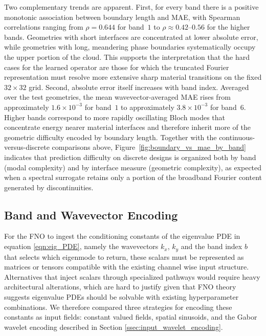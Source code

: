 \documentclass[preprint,review,12pt,numafflabel]{elsarticle}
\begin{document}
Two complementary trends are apparent. First, for every band there is a positive monotonic association between boundary length and MAE, with Spearman correlations ranging from $\rho=0.644$ for band~$1$ to $\rho\approx0.42$--$0.56$ for the higher bands. Geometries with short interfaces are concentrated at lower absolute error, while geometries with long, meandering phase boundaries systematically occupy the upper portion of the cloud. This supports the interpretation that the hard cases for the learned operator are those for which the truncated Fourier representation must resolve more extensive sharp material transitions on the fixed $32\times32$ grid.
Second, absolute error itself increases with band index. Averaged over the test geometries, the mean wavevector-averaged MAE rises from approximately $1.6\times10^{-3}$ for band~$1$ to approximately $3.8\times10^{-3}$ for band~$6$. Higher bands correspond to more rapidly oscillating Bloch modes that concentrate energy nearer material interfaces and therefore inherit more of the geometric difficulty encoded by boundary length. Together with the continuous-versus-discrete comparisons above, Figure~\ref{fig:boundary_vs_mae_by_band} indicates that prediction difficulty on discrete designs is organized both by band (modal complexity) and by interface measure (geometric complexity), as expected when a spectral surrogate retains only a portion of the broadband Fourier content generated by discontinuities.

\subsection{Band and Wavevector Encoding}
\label{ssec:band_wavevector_encoding}
For the FNO to ingest the conditioning constants of the eigenvalue PDE in equation \ref{eqn:eig_PDE}, namely the wavevectors $k_x$, $k_y$ and the band index $b$ that selects which eigenmode to return, these scalars must be represented as matrices or tensors compatible with the existing channel wise input structure. Alternatives that inject scalars through specialized pathways would require heavy architectural alterations, which are hard to justify given that FNO theory suggests eigenvalue PDEs should be solvable with existing hyperparameter combinations. We therefore compared three strategies for encoding these constants as input fields: constant valued fields, spatial sinusoids, and the Gabor wavelet encoding described in Section \ref{ssec:input_wavelet_encoding}.
\end{document}
